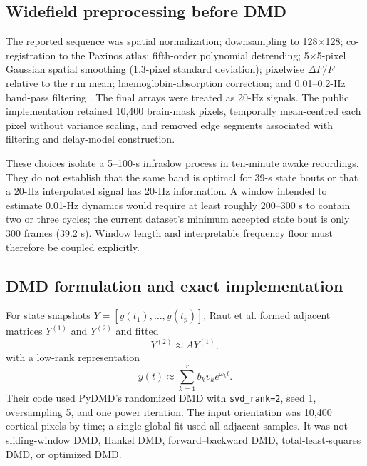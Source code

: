 \documentclass[11pt,a4paper]{article}
\begin{document}
\subsection{Widefield preprocessing before DMD}

The reported sequence was spatial normalization; downsampling to 128$\times$128; co-registration to the Paxinos atlas; fifth-order polynomial detrending; 5$\times$5-pixel Gaussian spatial smoothing (1.3-pixel standard deviation); pixelwise $\Delta F/F$ relative to the run mean; haemoglobin-absorption correction; and 0.01--0.2-Hz band-pass filtering \citep{raut2025}. The final arrays were treated as 20-Hz signals. The public implementation retained 10,400 brain-mask pixels, temporally mean-centred each pixel without variance scaling, and removed edge segments associated with filtering and delay-model construction.

These choices isolate a 5--100-s infraslow process in ten-minute awake recordings. They do not establish that the same band is optimal for 39-s state bouts or that a 20-Hz interpolated signal has 20-Hz information. A window intended to estimate 0.01-Hz dynamics would require at least roughly 200--300 s to contain two or three cycles; the current dataset's minimum accepted state bout is only 300 frames (39.2 s). Window length and interpretable frequency floor must therefore be coupled explicitly.

\subsection{DMD formulation and exact implementation}

For state snapshots $Y=[y(t_1),\ldots,y(t_p)]$, Raut et al. formed adjacent matrices $Y^{(1)}$ and $Y^{(2)}$ and fitted
\begin{equation}
  Y^{(2)} \approx A Y^{(1)},
\end{equation}
with a low-rank representation
\begin{equation}
  y(t) \approx \sum_{k=1}^{r} b_k v_k e^{\omega_k t}.
\end{equation}
Their code used PyDMD's randomized DMD with \texttt{svd\_rank=2}, seed 1, oversampling 5, and one power iteration. The input orientation was 10,400 cortical pixels by time; a single global fit used all adjacent samples. It was not sliding-window DMD, Hankel DMD, forward--backward DMD, total-least-squares DMD, or optimized DMD.
\end{document}
